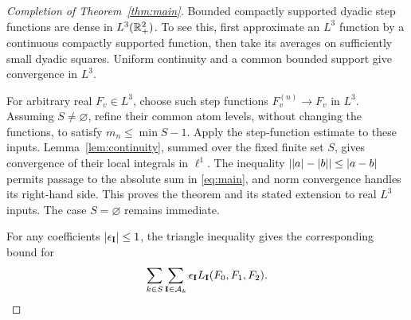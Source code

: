 \begin{proof}[Completion of Theorem~\ref{thm:main}]
Bounded compactly supported dyadic step functions are dense in
\(L^3(\mathbb R_+^2)\). To see this, first approximate an \(L^3\) function by
a continuous compactly supported function, then take its averages on
sufficiently small dyadic squares. Uniform continuity and a common
bounded support give convergence in \(L^3\).

For arbitrary real \(F_v\in L^3\), choose such step functions
\(F_v^{(n)}\to F_v\) in \(L^3\). Assuming \(S\ne\varnothing\),
refine their common atom levels, without changing the functions, to
satisfy \(m_n\le\min S-1\). Apply the step-function estimate to these
inputs. Lemma~\ref{lem:continuity}, summed over the fixed finite set
\(S\), gives convergence of their local integrals in \(\ell^1\).
The inequality \(\lvert \lvert a\rvert-\lvert b\rvert\rvert\le\lvert a-b\rvert\) permits passage to
the absolute sum in \eqref{eq:main}, and norm convergence handles its
right-hand side. This proves the theorem and its stated extension
to real \(L^3\) inputs. The case \(S=\varnothing\) remains immediate.

For any coefficients
\(\lvert \epsilon_{\mathbf I}\rvert\le1\), the triangle inequality gives
the corresponding bound for
\[
 \sum_{k\in S}\sum_{\mathbf I\in\mathcal A_k}
 \epsilon_{\mathbf I}L_{\mathbf I}(F_0,F_1,F_2).
 \qedhere
\]
\end{proof}
